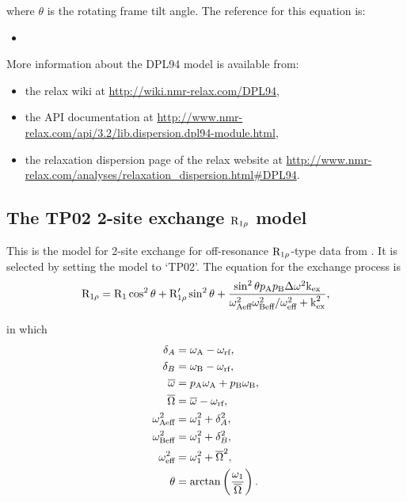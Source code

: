 where $\theta$ is the rotating frame tilt angle.
The reference for this equation is:
\begin{itemize}
  \item {}
\end{itemize}

More information about the DPL94 model is available from:
\begin{itemize}
  \item the relax wiki at \url{http://wiki.nmr-relax.com/DPL94},
  \item the API documentation at \url{http://www.nmr-relax.com/api/3.2/lib.dispersion.dpl94-module.html},
  \item the relaxation dispersion page of the relax website at \url{http://www.nmr-relax.com/analyses/relaxation\_dispersion.html#DPL94}.
\end{itemize}



\subsection{The TP02 2-site exchange $\mathrm{R}_{1\rho}$ model}
\label{sect: dispersion: TP02 model}

This is the model for 2-site exchange for off-resonance $\mathrm{R}_{1\rho}$-type data from \citet{TrottPalmer02}.
It is selected by setting the model to `TP02'.
The equation for the exchange process is
\begin{equation}
    \mathrm{R}_{1\rho} = \mathrm{R}_1\cos^2\theta + \mathrm{R}_{1\rho}'\sin^2\theta + \frac{\sin^2\theta p_{\textrm{A}}p_{\textrm{B}}\Delta\omega^2\textrm{k}_{\textrm{ex}}}{\omega_{\textrm{Aeff}}^2\omega_{\textrm{Beff}}^2/\omega_{\textrm{eff}}^2 + \textrm{k}_{\textrm{ex}}^2},
\end{equation}

in which
\begin{subequations}
\begin{align}
    \delta_A &= \omega_{\textrm{A}} - \omega_{\textrm{rf}}, \label{eq: deltaA}\\
    \delta_B &= \omega_{\textrm{B}} - \omega_{\textrm{rf}}, \label{eq: deltaB} \\
    \overline{\omega} &= p_{\textrm{A}}\omega_{\textrm{A}} + p_{\textrm{B}}\omega_{\textrm{B}}, \\
    \overline{\Omega} &= \overline{\omega} - \omega_{\textrm{rf}}, \\
    \omega_{\textrm{Aeff}}^2 &= \omega_1^2 + \delta_A^2, \\
    \omega_{\textrm{Beff}}^2 &= \omega_1^2 + \delta_B^2, \\
    \omega_{\textrm{eff}}^2 &= \omega_1^2 + \overline{\Omega}^2, \\
    \theta &= \arctan \left( \frac{\omega_1}{\overline{\Omega}} \right).
\end{align}
\end{subequations}

